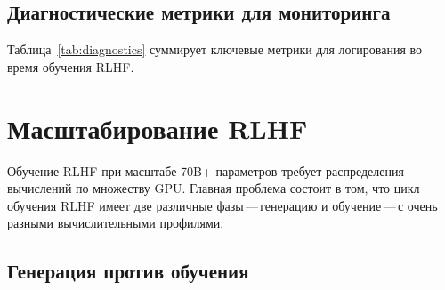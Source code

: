 \subsection{Диагностические метрики для мониторинга}
\label{sec:diagnostics}

Таблица~\ref{tab:diagnostics} суммирует ключевые метрики для логирования во время обучения RLHF.

\begin{table}[ht]
\centering
{\footnotesize


}
\caption{Диагностические метрики для обучения RLHF. «Тревожный сигнал» означает значение, требующее расследования.}
\label{tab:diagnostics}
\end{table}

\section{Масштабирование RLHF}
\label{sec:scaling-rlhf}

Обучение RLHF при масштабе 70B+ параметров требует распределения вычислений по множеству GPU. Главная проблема состоит в том, что цикл обучения RLHF имеет две различные фазы\,---\,генерацию и обучение\,---\,с очень разными вычислительными профилями.

\subsection{Генерация против обучения}

